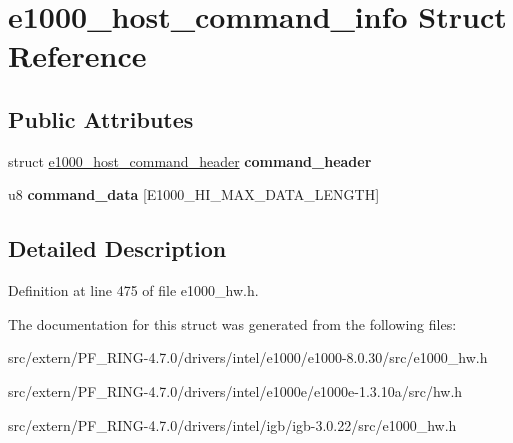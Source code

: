 \hypertarget{structe1000__host__command__info}{
\section{e1000\_\-host\_\-command\_\-info Struct Reference}
\label{structe1000__host__command__info}
}
\subsection*{Public Attributes}
\begin{DoxyCompactItemize}
\item 
\hypertarget{structe1000__host__command__info_a454634a5f9e022a2e90e3fc54f0fa614}{
struct \hyperlink{structe1000__host__command__header}{e1000\_\-host\_\-command\_\-header} {\bfseries command\_\-header}}
\label{structe1000__host__command__info_a454634a5f9e022a2e90e3fc54f0fa614}

\item 
\hypertarget{structe1000__host__command__info_ada92249284cf15742f427898d55444b8}{
u8 {\bfseries command\_\-data} \mbox{[}E1000\_\-HI\_\-MAX\_\-DATA\_\-LENGTH\mbox{]}}
\label{structe1000__host__command__info_ada92249284cf15742f427898d55444b8}

\end{DoxyCompactItemize}


\subsection{Detailed Description}


Definition at line 475 of file e1000\_\-hw.h.



The documentation for this struct was generated from the following files:\begin{DoxyCompactItemize}
\item 
src/extern/PF\_\-RING-\/4.7.0/drivers/intel/e1000/e1000-\/8.0.30/src/e1000\_\-hw.h\item 
src/extern/PF\_\-RING-\/4.7.0/drivers/intel/e1000e/e1000e-\/1.3.10a/src/hw.h\item 
src/extern/PF\_\-RING-\/4.7.0/drivers/intel/igb/igb-\/3.0.22/src/e1000\_\-hw.h\end{DoxyCompactItemize}

